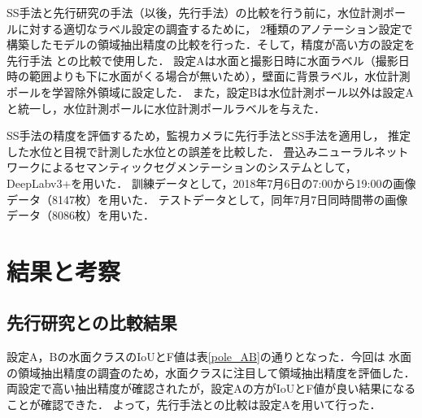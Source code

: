 \documentclass[a4j,twocolumn,10pt]{jarticle}
\begin{document}
SS手法と先行研究\cite{watanabe}の手法（以後，先行手法）の比較を行う前に，水位計測ポールに対する適切なラベル設定の調査するために，
2種類のアノテーション設定で構築したモデルの領域抽出精度の比較を行った．そして，精度が高い方の設定を先行手法
との比較で使用した．
設定Aは水面と撮影日時に水面ラベル（撮影日時の範囲よりも下に水面がくる場合が無いため），壁面に背景ラベル，水位計測ポールを学習除外領域に設定した．
また，設定Bは水位計測ポール以外は設定Aと統一し，水位計測ポールに水位計測ポールラベルを与えた．

SS手法の精度を評価するため，監視カメラに先行手法とSS手法を適用し，
推定した水位と目視で計測した水位との誤差を比較した．
畳込みニューラルネットワークによるセマンティックセグメンテーションのシステムとして，
DeepLabv3+\cite{deeplabv3+}を用いた．
訓練データとして，2018年7月6日の7:00から19:00の画像データ（8147枚）を用いた．
テストデータとして，同年7月7日同時間帯の画像データ（8086枚）を用いた．

\section{結果と考察}
\subsection{先行研究との比較結果}



設定A，Bの水面クラスのIoU\cite{IoU}とF値\cite{bf}は表\ref{pole_AB}の通りとなった．今回は
水面の領域抽出精度の調査のため，水面クラスに注目して領域抽出精度を評価した． 
両設定で高い抽出精度が確認されたが，設定Aの方がIoUとF値が良い結果になることが確認できた．
よって，先行手法との比較は設定Aを用いて行った．
\end{document}

